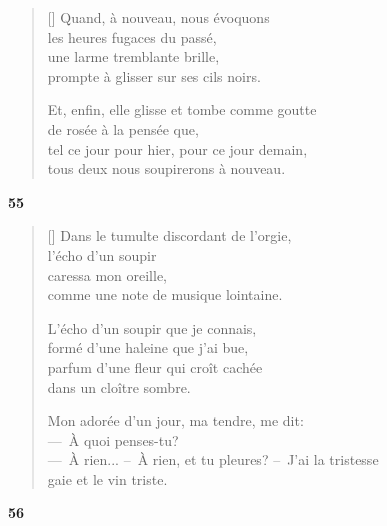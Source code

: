 \documentclass[a4paper,12pt]{book}
\begin{document}
\settowidth{\versewidth}{et, à nouveau, leurs fleurs s'ouvriront le soir,}

\begin{verse}[\versewidth]
  Quand, à nouveau, nous évoquons \\
  les heures fugaces du passé, \\
  une larme tremblante brille, \\
  prompte à glisser sur ses cils noirs.

  Et, enfin, elle glisse et tombe comme goutte \\
  de rosée à la pensée que, \\
  tel ce jour pour hier, pour ce jour demain, \\
  tous deux nous soupirerons à nouveau.
\end{verse}

\bigskip

\begin{center}
  \textbf{55}
\end{center}

\settowidth{\versewidth}{---~À rien... --~À rien, et tu pleures? --~J'ai la tristesse}

\begin{verse}[\versewidth]
  Dans le tumulte discordant de l'orgie, \\
  l'écho d'un soupir \\
  caressa mon oreille, \\
  comme une note de musique lointaine.

  L'écho d'un soupir que je connais, \\
  formé d'une haleine que j'ai bue, \\
  parfum d'une fleur qui croît cachée \\
  dans un cloître sombre.

  Mon adorée d'un jour, ma tendre, me dit: \\
  ---~À quoi penses-tu? \\
  ---~À rien... --~À rien, et tu pleures? --~J'ai la tristesse \\
    gaie et le vin triste.
\end{verse}

\bigskip

\begin{center}
  \textbf{56}
\end{center}
\end{document}
